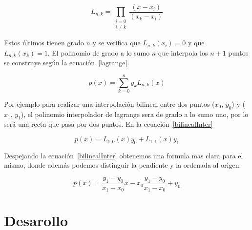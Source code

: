 \documentclass[a4paper]{article}
\begin{document}
\begin{equation}
L_{n,k}= \prod_{\substack{i=0\\i\neq k}} \frac{(x-x_{i})}{(x_{k}-x_{i})}
\label{Ls}
\end{equation}

Estos últimos tienen grado $ n $ y se verifica que  $ L_{n,k}(x_{i})= 0 $ y que $ L_{n,k}(x_{k})= 1 $. El polinomio de grado a lo sumo $ n $ que interpola los $ n +1 $ puntos se construye según la ecuación~\ref{lagrange}.

\begin{equation}
p(x)= \sum_{k=0}^{n}y_{k}L_{n,k}(x)
\label{lagrange}
\end{equation}

Por ejemplo para realizar una interpolación bilineal entre dos puntos ($ x_{0} $, $ y_{0} $) y ($ x_{1} $, $ y_{1} $), el polinomio interpolador de lagrange sera de grado a lo sumo uno, por lo será una recta que pasa por dos puntos. En la ecuación~\ref{bilinealInter}

\begin{equation}
p(x)= L_{1,0}(x)y_{0} + L_{1,1}(x)y_{1}
\label{bilinealInter}
\end{equation}

Despejando la ecuación~\ref{bilinealInter} obtenemos una formula mas clara para el mismo, donde además podemos distinguir la pendiente y la ordenada al origen.

\begin{equation}
p(x)= \frac{y_{1}-y_{0}}{x_{1}-x_{0}} x - x_{0} \frac{y_{1}-y_{0}}{x_{1}-x_{0}} + y_{0}
\label{bilineal}
\end{equation}



\newpage 

\section{Desarollo}
\end{document}
